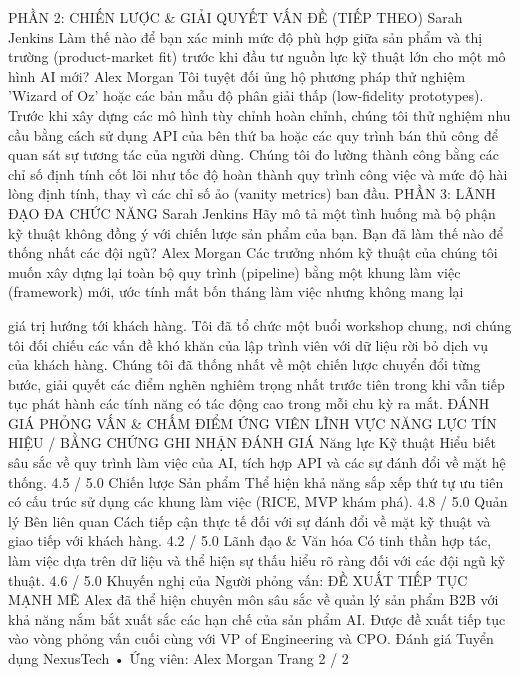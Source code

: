 PHẦN 2: CHIẾN LƯỢC \& GIẢI QUYẾT VẤN ĐỀ (TIẾP THEO)
Sarah Jenkins
Làm thế nào để bạn xác minh mức độ phù hợp giữa sản phẩm và thị trường (product-market fit) trước khi đầu tư nguồn lực kỹ thuật lớn cho một mô hình AI mới?
Alex Morgan
Tôi tuyệt đối ủng hộ phương pháp thử nghiệm 'Wizard of Oz' hoặc các bản mẫu độ phân giải thấp (low-fidelity prototypes). Trước khi xây dựng các mô hình tùy chỉnh hoàn chỉnh, chúng tôi thử nghiệm nhu cầu bằng cách sử dụng API của bên thứ ba hoặc các quy trình bán thủ công để quan sát sự tương tác của người dùng. Chúng tôi đo lường thành công bằng các chỉ số định tính cốt lõi như tốc độ hoàn thành quy trình công việc và mức độ hài lòng định tính, thay vì các chỉ số ảo (vanity metrics) ban đầu.
PHẦN 3: LÃNH ĐẠO ĐA CHỨC NĂNG
Sarah Jenkins
Hãy mô tả một tình huống mà bộ phận kỹ thuật không đồng ý với chiến lược sản phẩm của bạn. Bạn đã làm thế nào để thống nhất các đội ngũ?
Alex Morgan
Các trưởng nhóm kỹ thuật của chúng tôi muốn xây dựng lại toàn bộ quy trình (pipeline) bằng một khung làm việc (framework) mới, ước tính mất bốn tháng làm việc nhưng không mang lại

giá trị hướng tới khách hàng. Tôi đã tổ chức một buổi workshop chung, nơi chúng tôi đối chiếu các vấn đề khó khăn của lập trình viên với dữ liệu rời bỏ dịch vụ của khách hàng. Chúng tôi đã thống nhất về một chiến lược chuyển đổi từng bước, giải quyết các điểm nghẽn nghiêm trọng nhất trước tiên trong khi vẫn tiếp tục phát hành các tính năng có tác động cao trong mỗi chu kỳ ra mắt.
ĐÁNH GIÁ PHỎNG VẤN \& CHẤM ĐIỂM ỨNG VIÊN
LĨNH VỰC NĂNG LỰC
TÍN HIỆU / BẰNG CHỨNG GHI NHẬN
ĐÁNH GIÁ
Năng lực Kỹ thuật
Hiểu biết sâu sắc về quy trình làm việc của AI, tích hợp API và các sự đánh đổi về mặt hệ thống.
4.5 /
5.0
Chiến lược Sản phẩm
Thể hiện khả năng sắp xếp thứ tự ưu tiên có cấu trúc sử dụng các khung làm việc (RICE, MVP khám phá).
4.8 /
5.0
Quản lý Bên liên quan
Cách tiếp cận thực tế đối với sự đánh đổi về mặt kỹ thuật và giao tiếp với khách hàng.
4.2 /
5.0
Lãnh đạo \&
Văn hóa
Có tinh thần hợp tác, làm việc dựa trên dữ liệu và thể hiện sự thấu hiểu rõ ràng đối với các đội ngũ kỹ thuật.
4.6 /
5.0
Khuyến nghị của Người phỏng vấn: ĐỀ XUẤT TIẾP TỤC MẠNH MẼ
Alex đã thể hiện chuyên môn sâu sắc về quản lý sản phẩm B2B với khả năng nắm bắt xuất sắc các hạn chế của sản phẩm AI. Được đề xuất tiếp tục vào vòng phỏng vấn cuối cùng với VP of Engineering và CPO.
Đánh giá Tuyển dụng NexusTech • Ứng viên: Alex Morgan
Trang 2 / 2
